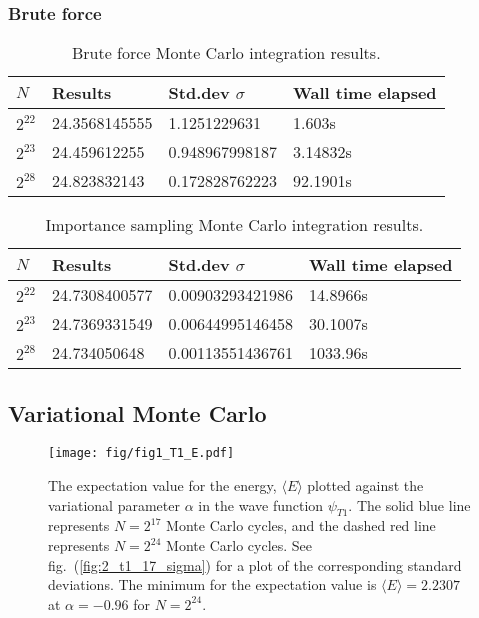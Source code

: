 \documentclass[a4paper,11pt]{article}
\begin{document}
\subsubsection{Brute force}

\begin{table}
    \centering
    \caption{Brute force Monte Carlo integration results.}
    \begin{tabular}{l l l l}
        \hline
        $N$         &   Results     & Std.dev $\sigma$  & Wall time elapsed  \\
        \hline
        $2^{22}$    & 24.3568145555 & 1.1251229631   & 1.603s \\
        $2^{23}$    & 24.459612255  & 0.948967998187 & 3.14832s \\
        $2^{28}$    & 24.823832143  & 0.172828762223 & 92.1901s \\
        \hline
    \end{tabular}
    \label{tab:res_bruteforceMC}
\end{table}
\begin{table}
    \centering
    \caption{Importance sampling Monte Carlo integration results.}
    \begin{tabular}{l l l l}
        \hline
        $N$         &   Results     & Std.dev $\sigma$ & Wall time elapsed  \\
        \hline
        $2^{22}$    & 24.7308400577 & 0.00903293421986 & 14.8966s \\
        $2^{23}$    & 24.7369331549 & 0.00644995146458 & 30.1007s \\
        $2^{28}$    & 24.734050648  & 0.00113551436761 & 1033.96s \\
        \hline
    \end{tabular}
    \label{tab:res_importanceMC}
\end{table}

\subsection{Variational Monte Carlo}
\begin{figure}[htb]
    \centering
    \texttt{[image: fig/fig1\_T1\_E.pdf]}
    \caption{The expectation value for the energy, $\langle E \rangle$ plotted against the variational parameter $\alpha$ in the wave function $\psi_{T1}$. The solid blue line represents $N=2^{17}$ Monte Carlo cycles, and the dashed red line represents $N=2^{24}$ Monte Carlo cycles. See fig.~(\ref{fig:2_t1_17_sigma}) for a plot of the corresponding standard deviations. The minimum for the expectation value is $\langle E \rangle = 2.2307$ at $\alpha = -0.96$ for $N=2^{24}$.}
    \label{fig:2_t1_17_E}
\end{figure}
\end{document}
